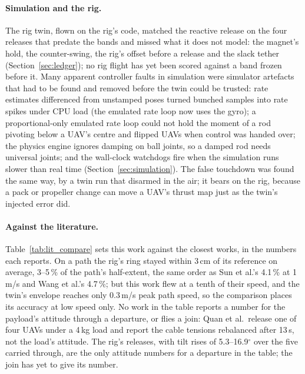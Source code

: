\paragraph{Simulation and the rig.} The rig twin, flown on the rig's code, matched the reactive release on the four
releases that predate the bands and missed what it does not model: the magnet's hold, the counter-swing, the rig's
offset before a release and the slack tether (Section~\ref{sec:ledger}); no rig flight has yet been scored against a
band frozen before it. Many apparent controller faults in simulation were simulator
artefacts that had to be found and removed before the twin could be trusted: rate estimates differenced from unstamped
poses turned bunched samples into rate spikes under CPU load (the emulated rate loop now uses the gyro); a
proportional-only emulated rate loop could not hold the moment of a rod pivoting below a UAV's centre and flipped UAVs
when control was handed over; the physics engine ignores damping on ball joints, so a damped rod needs universal
joints; and the wall-clock watchdogs fire when the simulation runs slower than real time
(Section~\ref{sec:simulation}). The false touchdown was found the same way, by a twin run that disarmed in the air;
it bears on the rig, because a pack or propeller change can move a UAV's thrust map just as the twin's injected error
did.

\paragraph{Against the literature.} Table~\ref{tab:lit_compare} sets this work against the closest works, in the
numbers each reports. On a path the rig's ring stayed within 3\,cm of its reference on average, 3--5\,\% of the
path's half-extent, the same order as Sun et al.'s 4.1\,\% at 1\,m/s and Wang et al.'s 4.7\,\%; but this work flew at
a tenth of their speed, and the twin's envelope reaches only 0.3\,m/s peak path speed, so the comparison places its accuracy at low
speed only. No work in the table reports a number for the payload's attitude through a departure, or flies a join:
Quan et al.\ release one of four UAVs under a 4\,kg load and report the cable tensions rebalanced after 13\,s, not the
load's attitude. The rig's releases, with tilt rises of 5.3--16.9$^\circ$ over the five carried through, are the only
attitude numbers for a departure in the table; the join has yet to give its number.

